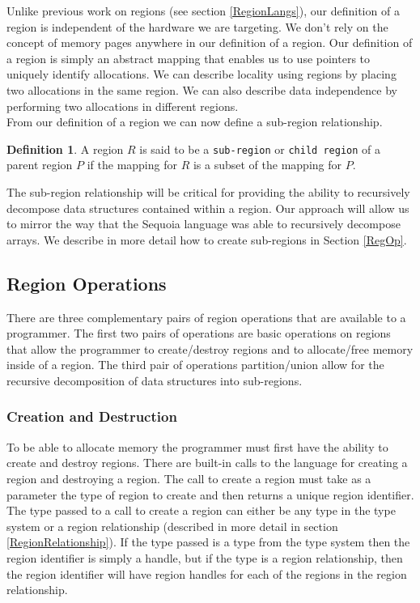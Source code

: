 \documentclass{article}
\theoremstyle{definition}
\newtheorem{definition}{Definition}
\begin{document}
\noindent
Unlike previous work on regions (see section \ref{RegionLangs}), our 
definition of a region is independent of the hardware we are targeting.  
We don't rely on the concept of memory pages anywhere in our definition of 
a region.  Our definition of a region is simply an abstract  mapping that 
enables us to use pointers to uniquely identify allocations.  We can
describe locality using regions by placing two allocations in the same region.
We can also describe data independence by performing two allocations in different
regions. \\

\noindent
From our definition of a region we can now define a sub-region relationship.

\begin{definition}
A region $R$ is said to be a {\tt sub-region} or {\tt child region} of a parent region $P$
if the mapping for $R$ is a subset of the mapping for $P$.
\end{definition}

\noindent
The sub-region relationship will be critical for providing the ability 
to recursively decompose data structures contained within a region.  Our approach
will allow us to mirror the way that the Sequoia language was able to recursively 
decompose arrays.  We describe in more detail how to create sub-regions in Section
\ref{RegOp}. \\

\subsection{Region Operations \label{RegOp}}
\noindent
There are three complementary pairs of region operations that are available to a
programmer.  The first two pairs of operations are basic operations on regions 
that allow the programmer to create/destroy regions and to allocate/free memory
inside of a region.  The third pair of operations partition/union allow for the recursive
decomposition of data structures into sub-regions.

\subsubsection{Creation and Destruction \label{CreateDestroy}}
\noindent
To be able to allocate memory the programmer must first have the ability to create
and destroy regions.  There are built-in calls to the language for creating a region
and destroying a region.  The call to create a region must take as a parameter the
type of region to create and then returns a unique region identifier.  The type
passed to a call to create a region can either be any type in the type system 
or a region relationship (described in more detail in section \ref{RegionRelationship}).
If the type passed is a type from the type system then the region identifier
is simply a handle, but if the type is a region relationship, then the region
identifier will have region handles for each of the regions in the region relationship. \\
\end{document}
